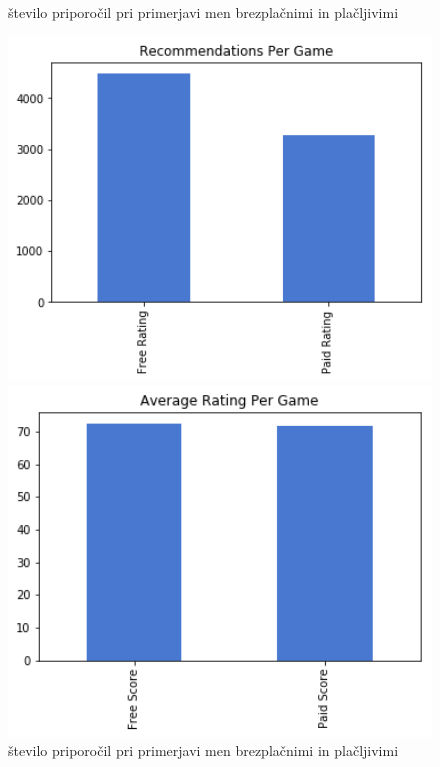 \documentclass[a4paper]{article}
\begin{document}
\begin{figure}[h]
    \centering
    \begin{minipage}{0.45\textwidth}
			\centering
			\caption{število priporočil pri primerjavi men brezplačnimi in plačljivimi \label{fig:freevspaid_rating}}
			\includegraphics[width=1\textwidth,keepaspectratio]{graf_stevilo_ocen.png}
    \end{minipage}\hfill
    \begin{minipage}{0.45\textwidth}
			\centering
			\caption{število priporočil pri primerjavi men brezplačnimi in plačljivimi \label{fig:Freevspaid_score}}
			\includegraphics[width=1\textwidth,keepaspectratio]{graf_povprecna_ocena.png}
    \end{minipage}
\end{figure}
\end{document}
